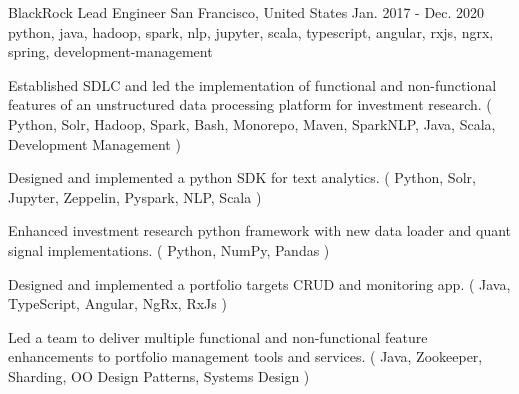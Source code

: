 \cventry
    {BlackRock} %
    {Lead Engineer} %
    {San Francisco, United States} %
    {Jan. 2017 - Dec. 2020} %
    { python, java, hadoop, spark, nlp, jupyter, scala, typescript, angular, rxjs, ngrx, spring, development-management} %
    {
    \begin{cvitems} %
        \item { Established SDLC and led the implementation of functional and non-functional features of an unstructured data processing platform for investment research. ( Python, Solr, Hadoop, Spark, Bash, Monorepo, Maven, SparkNLP, Java, Scala, Development Management ) }
        \item { Designed and implemented a python SDK for text analytics. ( Python, Solr, Jupyter, Zeppelin, Pyspark, NLP, Scala )}
        \item { Enhanced investment research python framework with new data loader and quant signal implementations. ( Python, NumPy, Pandas )}
        \item { Designed and implemented a portfolio targets CRUD and monitoring app. ( Java, TypeScript, Angular, NgRx, RxJs ) }
        \item { Led a team to deliver multiple functional and non-functional feature enhancements to portfolio management tools and services. ( Java, Zookeeper, Sharding, OO Design Patterns, Systems Design )}
    \end{cvitems}
    }





